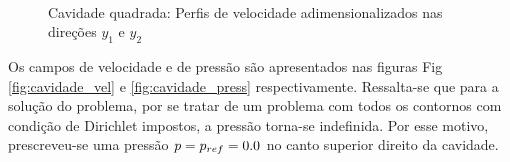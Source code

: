 \documentclass[tese_patricia]{subfiles}%
\begin{document}
\begin{figure}[!t]
	 \\
	\caption{Cavidade quadrada: Perfis de velocidade adimensionalizados nas direções $y_1$ e $y_2$  }
	\label{fig:cavidade_graficos}
\end{figure}

Os campos de velocidade e de pressão são apresentados nas figuras Fig \ref{fig:cavidade_vel} e \ref{fig:cavidade_press} respectivamente. Ressalta-se que para a solução do problema, por se tratar de um problema com todos os contornos com condição de Dirichlet impostos, a pressão torna-se indefinida. Por esse motivo, prescreveu-se uma pressão $p = p_{ref} =  0.0$ no canto superior direito da cavidade. 
\end{document}
